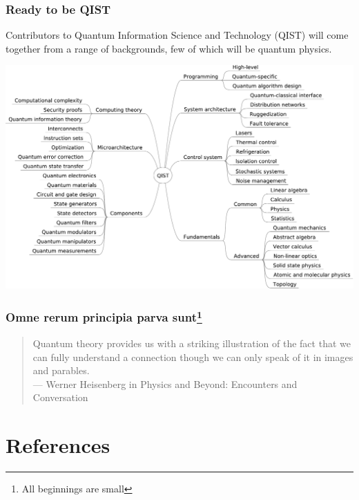 \documentclass[handout]{beamer}
\begin{document}
\begin{frame}
  \frametitle{Ready to be QIST}
  {\footnotesize %
    Contributors to Quantum Information Science and Technology (QIST) will
    come together from a range of backgrounds, few of which will be quantum
    physics. %
  }

  \mbox{}\hfill%
  \includegraphics[width=0.85\linewidth]{Graphics/QInfo-tree-crop.pdf} %
  \hfill\mbox{}
\end{frame}

\begin{frame}
  \frametitle{Omne rerum principia parva sunt\footnote{All beginnings are small}}
  \mbox{}\vfill%
  \begin{quote}
    Quantum theory provides us with a striking illustration of the fact
    that we can fully understand a connection though we can only speak of
    it in images and parables.\\
    --- Werner Heisenberg in Physics and Beyond: Encounters and Conversation
  \end{quote}
  \vfill\mbox{}
\end{frame}

\section{References}
\end{document}
